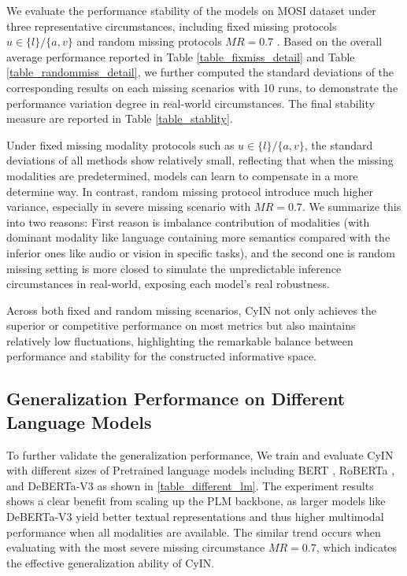 \documentclass{article}
\begin{document}
We evaluate the performance stability of the models on MOSI dataset under three representative circumstances, including fixed missing protocols $u\in\{l\}/\{a,v\}$ and random missing protocols $MR=0.7$ . Based on the overall average performance reported in Table \ref{table_fixmiss_detail} and Table \ref{table_randommiss_detail}, we further computed the standard deviations of the corresponding results on each missing scenarios with 10 runs, to demonstrate the performance variation degree in real-world circumstances. The final stability measure are reported in Table \ref{table_stablity}.


Under fixed missing modality protocols such as $u\in\{l\}/\{a,v\}$, the standard deviations of all methods show relatively small, reflecting that when the missing modalities are predetermined, models can learn to compensate in a more determine way. In contrast, random missing protocol introduce much higher variance, especially in severe missing scenario with $MR=0.7$. We summarize this into two reasons: First reason is imbalance contribution of modalities (with dominant modality like language containing more semantics compared with the inferior ones like audio or vision in specific tasks), and the second one is random missing setting is more closed to simulate the unpredictable inference circumstances in real‑world, exposing each model’s real robustness.

Across both fixed and random missing scenarios, CyIN not only achieves the superior or competitive performance on most metrics but also maintains relatively low fluctuations, highlighting the remarkable balance between performance and stability for the constructed informative space.

\subsection{Generalization Performance on Different Language Models}
To further validate the generalization performance, We train and evaluate CyIN with different sizes of Pretrained language models including BERT \cite{devlin2019bert}, RoBERTa \cite{liu2019roberta}, and DeBERTa-V3 \cite{he2023debertav3} as shown in \ref{table_different_lm}. The experiment results shows a clear benefit from scaling up the PLM backbone, as larger models like DeBERTa-V3 yield better textual representations and thus higher multimodal performance when all modalities are available. The similar trend occurs when evaluating with the most severe missing circumstance $MR=0.7$, which indicates the effective generalization ability of CyIN.
\end{document}
